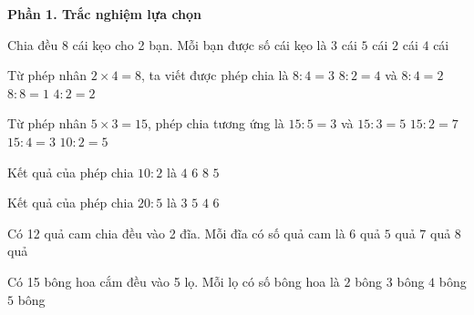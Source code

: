 \textbf{Phần 1. Trắc nghiệm lựa chọn}

\begin{ex} %
Chia đều 8 cái kẹo cho 2 bạn. Mỗi bạn được số cái kẹo là
\choice
{$3$ cái}
{$5$ cái}
{$2$ cái}
{\True $4$ cái}
\end{ex}

\begin{ex} %
Từ phép nhân $2 \times 4 = 8$, ta viết được phép chia là
\choice
{$8 : 4 = 3$}
{\True $8 : 2 = 4$ và $8 : 4 = 2$}
{$8 : 8 = 1$}
{$4 : 2 = 2$}
\end{ex}

\begin{ex} %
Từ phép nhân $5 \times 3 = 15$, phép chia tương ứng là
\choice
{\True $15 : 5 = 3$ và $15 : 3 = 5$}
{$15 : 2 = 7$}
{$15 : 4 = 3$}
{$10 : 2 = 5$}
\end{ex}

\begin{ex} %
Kết quả của phép chia $10 : 2$ là
\choice
{$4$}
{$6$}
{$8$}
{\True $5$}
\end{ex}

\begin{ex} %
Kết quả của phép chia $20 : 5$ là
\choice
{$3$}
{$5$}
{\True $4$}
{$6$}
\end{ex}

\begin{ex} %
Có 12 quả cam chia đều vào 2 đĩa. Mỗi đĩa có số quả cam là
\choice
{\True $6$ quả}
{$5$ quả}
{$7$ quả}
{$8$ quả}
\end{ex}

\begin{ex} %
Có 15 bông hoa cắm đều vào 5 lọ. Mỗi lọ có số bông hoa là
\choice
{$2$ bông}
{\True $3$ bông}
{$4$ bông}
{$5$ bông}
\end{ex}

